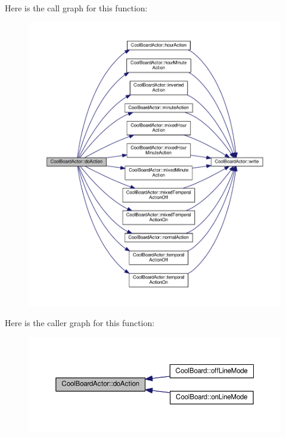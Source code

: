 Here is the call graph for this function\+:
\nopagebreak
\begin{figure}[H]
\begin{center}
\leavevmode
\includegraphics[width=350pt]{dc/d69/class_cool_board_actor_a96a45658d32c6b95caa2f385c7da32cd_cgraph}
\end{center}
\end{figure}
Here is the caller graph for this function\+:
\nopagebreak
\begin{figure}[H]
\begin{center}
\leavevmode
\includegraphics[width=350pt]{dc/d69/class_cool_board_actor_a96a45658d32c6b95caa2f385c7da32cd_icgraph}
\end{center}
\end{figure}
\mbox{\label{class_cool_board_actor_a81229abf5895f4d3b0355050b822b438}} 
